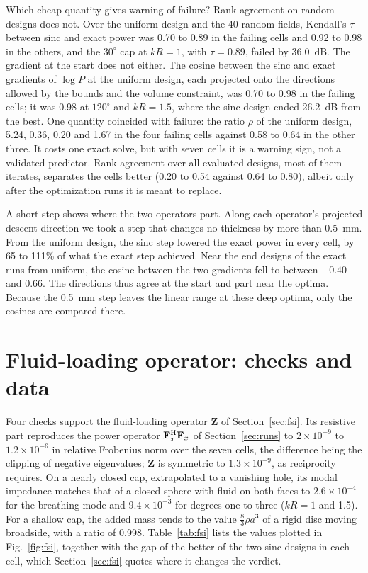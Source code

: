 \documentclass[preprint,12pt]{elsarticle}
\begin{document}
Which cheap quantity gives warning of failure? Rank agreement on random designs does not. Over the uniform design and the 40 random fields, Kendall's $\tau$ between sinc and exact power was 0.70 to 0.89 in the failing cells and 0.92 to 0.98 in the others, and the $30^\circ$ cap at $kR=1$, with $\tau=0.89$, failed by 36.0~dB. %
The gradient at the start does not either. The cosine between the sinc and exact gradients of $\log P$ at the uniform design, each projected onto the directions allowed by the bounds and the volume constraint, was 0.70 to 0.98 in the failing cells; it was 0.98 at $120^\circ$ and $kR=1.5$, where the sinc design ended 26.2~dB from the best. %
One quantity coincided with failure: the ratio $\rho$ of the uniform design, 5.24, 0.36, 0.20 and 1.67 in the four failing cells against 0.58 to 0.64 in the other three. %
It costs one exact solve, but with seven cells it is a warning sign, not a validated predictor. Rank agreement over all evaluated designs, most of them iterates, separates the cells better (0.20 to 0.54 against 0.64 to 0.80), albeit only after the optimization runs it is meant to replace. %

A short step shows where the two operators part. Along each operator's projected descent direction we took a step that changes no thickness by more than 0.5~mm. From the uniform design, the sinc step lowered the exact power in every cell, by 65 to 111\% of what the exact step achieved. %
Near the end designs of the exact runs from uniform, the cosine between the two gradients fell to between $-0.40$ and 0.66. %
The directions thus agree at the start and part near the optima. Because the 0.5~mm step leaves the linear range at these deep optima, only the cosines are compared there.

\section{Fluid-loading operator: checks and data}
\label{app:fsidata}
Four checks support the fluid-loading operator $\mathbf Z$ of Section~\ref{sec:fsi}. Its resistive part reproduces the power operator $\mathbf F_x^{\rm H}\mathbf F_x$ of Section~\ref{sec:runs} to $2\times10^{-9}$ to $1.2\times10^{-6}$ in relative Frobenius norm over the seven cells, the difference being the clipping of negative eigenvalues; $\mathbf Z$ is symmetric to $1.3\times10^{-9}$, as reciprocity requires. On a nearly closed cap, extrapolated to a vanishing hole, its modal impedance matches that of a closed sphere with fluid on both faces to $2.6\times10^{-4}$ for the breathing mode and $9.4\times10^{-3}$ for degrees one to three ($kR=1$ and 1.5). For a shallow cap, the added mass tends to the value $\tfrac83\rho a^3$ of a rigid disc moving broadside, with a ratio of 0.998. %
Table~\ref{tab:fsi} lists the values plotted in Fig.~\ref{fig:fsi}, together with the gap of the better of the two sinc designs in each cell, which Section~\ref{sec:fsi} quotes where it changes the verdict.
\end{document}
